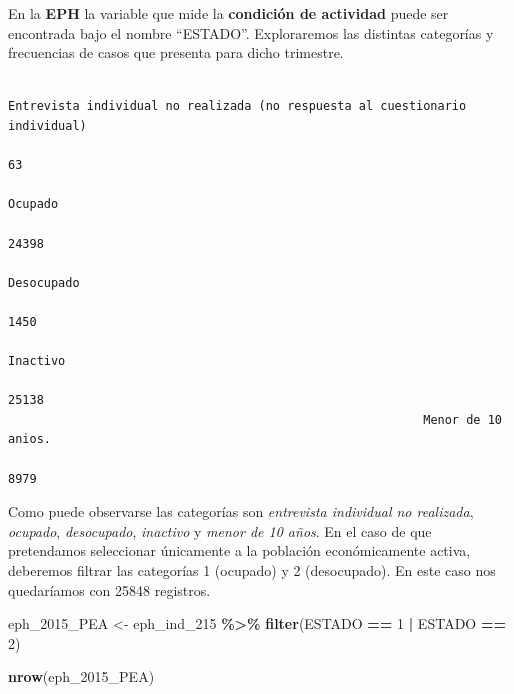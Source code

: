 \documentclass[
]{article}
\newenvironment{Shaded}{\begin{snugshade}}{\end{snugshade}}
\newcommand{\DecValTok}[1]{\textcolor[rgb]{0.00,0.00,0.81}{#1}}
\newcommand{\FunctionTok}[1]{\textcolor[rgb]{0.13,0.29,0.53}{\textbf{#1}}}
\newcommand{\NormalTok}[1]{#1}
\newcommand{\OtherTok}[1]{\textcolor[rgb]{0.56,0.35,0.01}{#1}}
\newcommand{\SpecialCharTok}[1]{\textcolor[rgb]{0.81,0.36,0.00}{\textbf{#1}}}
\begin{document}
En la \textbf{EPH} la variable que mide la \textbf{condición de actividad} puede ser encontrada bajo el nombre ``ESTADO''. Exploraremos las distintas categorías y frecuencias de casos que presenta para dicho trimestre.

\begin{Shaded}
\end{Shaded}

\begin{verbatim}

Entrevista individual no realizada (no respuesta al cuestionario individual) 
                                                                          63 
                                                                     Ocupado 
                                                                       24398 
                                                                  Desocupado 
                                                                        1450 
                                                                    Inactivo 
                                                                       25138 
                                                          Menor de 10 anios. 
                                                                        8979 
\end{verbatim}

Como puede observarse las categorías son \emph{entrevista individual no realizada}, \emph{ocupado}, \emph{desocupado}, \emph{inactivo} y \emph{menor de 10 años}. En el caso de que pretendamos seleccionar únicamente a la población económicamente activa, deberemos filtrar las categorías 1 (ocupado) y 2 (desocupado). En este caso nos quedaríamos con 25848 registros.

\begin{Shaded}
\begin{Highlighting}[]
\NormalTok{eph\_2015\_PEA }\OtherTok{\textless{}{-}}\NormalTok{ eph\_ind\_215 }\SpecialCharTok{\%\textgreater{}\%}
    \FunctionTok{filter}\NormalTok{(ESTADO }\SpecialCharTok{==} \DecValTok{1} \SpecialCharTok{|}\NormalTok{ ESTADO }\SpecialCharTok{==} \DecValTok{2}\NormalTok{)}

\FunctionTok{nrow}\NormalTok{(eph\_2015\_PEA)}
\end{Highlighting}
\end{Shaded}
\end{document}
